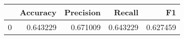 \begin{tabular}{lrrrr}
\toprule
{} &  Accuracy &  Precision &    Recall &        F1 \\
\midrule
0 &  0.643229 &   0.671009 &  0.643229 &  0.627459 \\
\bottomrule
\end{tabular}
